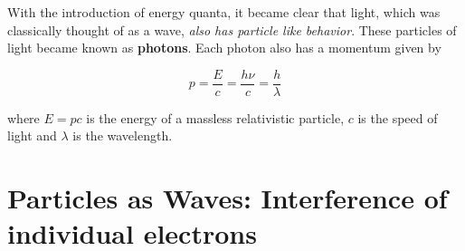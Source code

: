 With the introduction of energy quanta, it became clear that light, which was classically thought of as a wave, \textit{also has particle like behavior}. These particles of light became known as \textbf{photons}. Each photon also has a momentum given by 

\begin{equation}
	p = \frac{E}{c} = \frac{h\nu}{c} = \frac{h}{\lambda} \label{eq:photon-momentum}
\end{equation}

where $ E = pc $ is the energy of a massless relativistic particle, $c$ is the speed of light and $\lambda$ is the wavelength.

\section{Particles as Waves: Interference of individual electrons}

